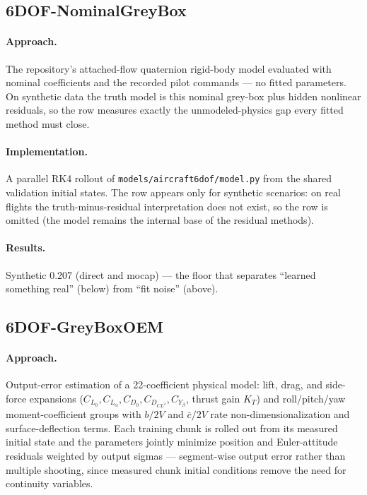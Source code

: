 \documentclass[11pt]{article}
\begin{document}
\subsection{6DOF-NominalGreyBox}
\paragraph{Approach.} The repository's attached-flow quaternion rigid-body
model evaluated with nominal coefficients and the recorded pilot commands ---
no fitted parameters. On synthetic data the truth model is this nominal
grey-box plus hidden nonlinear residuals, so the row measures exactly the
unmodeled-physics gap every fitted method must close.
\paragraph{Implementation.} A parallel RK4 rollout of
\texttt{models/aircraft6dof/model.py} from the shared validation initial
states. The row appears only for synthetic scenarios: on real flights the
truth-minus-residual interpretation does not exist, so the row is omitted
(the model remains the internal base of the residual methods).
\paragraph{Results.} Synthetic 0.207 (direct and mocap) --- the floor that
separates ``learned something real'' (below) from ``fit noise'' (above).

\subsection{6DOF-GreyBoxOEM}
\paragraph{Approach.} Output-error estimation \cite{jategaonkar2006flight}
of a 22-coefficient physical model: lift, drag, and side-force expansions
($C_{L_0}, C_{L_\alpha}, C_{D_0}, C_{D_{CL^2}}, C_{Y_\beta}$, thrust gain
$K_T$) and roll/pitch/yaw moment-coefficient groups with $b/2V$ and
$\bar c/2V$ rate non-dimensionalization and surface-deflection terms. Each
training chunk is rolled out from its measured initial state and the
parameters jointly minimize position and Euler-attitude residuals weighted
by output sigmas --- segment-wise output error rather than multiple
shooting, since measured chunk initial conditions remove the need for
continuity variables.
\end{document}
